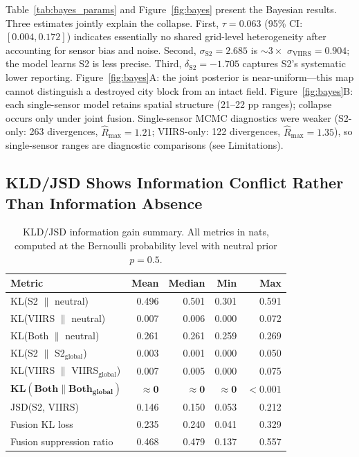 \documentclass[wcp]{jmlr}
\begin{document}
Table~\ref{tab:bayes_params} and Figure~\ref{fig:bayes} present the
Bayesian results. Three estimates jointly explain the collapse. First,
$\tau = 0.063$ (95\% CI: $[0.004, 0.172]$) indicates essentially no shared
grid-level heterogeneity after accounting for sensor bias and noise.
Second, $\sigma_{\text{S2}} = 2.685$ is $\sim3\times$ $\sigma_{\text{VIIRS}}
= 0.904$; the model learns S2 is less precise. Third, $\delta_{\text{S2}} =
-1.705$ captures S2's systematic lower reporting. Figure~\ref{fig:bayes}A:
the joint posterior is near-uniform---this map cannot distinguish a
destroyed city block from an intact field. Figure~\ref{fig:bayes}B: each
single-sensor model retains spatial structure (21--22 pp ranges); collapse
occurs only under joint fusion. Single-sensor MCMC diagnostics were weaker
(S2-only: 263 divergences, $\hat{R}_{\max}=1.21$; VIIRS-only: 122
divergences, $\hat{R}_{\max}=1.35$), so single-sensor ranges are diagnostic
comparisons (see Limitations).

\subsection{KLD/JSD Shows Information Conflict Rather Than Information
Absence}\label{sec:res-kld}

\begin{table}[htp]
\centering
\caption{KLD/JSD information gain summary. All metrics in nats, computed
at the Bernoulli probability level with neutral prior $p=0.5$.}
\label{tab:kld}
\begin{tabular}{@{}lrrrr@{}}
\toprule
\textbf{Metric} & \textbf{Mean} & \textbf{Median} & \textbf{Min} & \textbf{Max} \\
\midrule
KL(S2 $\|$ neutral)          & 0.496 & 0.501 & 0.301 & 0.591 \\
KL(VIIRS $\|$ neutral)       & 0.007 & 0.006 & 0.000 & 0.072 \\
KL(Both $\|$ neutral)        & 0.261 & 0.261 & 0.259 & 0.269 \\
KL(S2 $\|$ S2$_{\text{global}}$)    & 0.003 & 0.001 & 0.000 & 0.050 \\
KL(VIIRS $\|$ VIIRS$_{\text{global}}$) & 0.007 & 0.005 & 0.000 & 0.075 \\
$\mathbf{KL(Both \| Both_{\text{global}})}$ & $\mathbf{\approx 0}$ & $\mathbf{\approx 0}$ & $\mathbf{\approx 0}$ & $\mathbf{<0.001}$ \\
JSD(S2, VIIRS)               & 0.146 & 0.150 & 0.053 & 0.212 \\
Fusion KL loss               & 0.235 & 0.240 & 0.041 & 0.329 \\
Fusion suppression ratio     & 0.468 & 0.479 & 0.137 & 0.557 \\
\bottomrule
\end{tabular}
\end{table}
\end{document}
